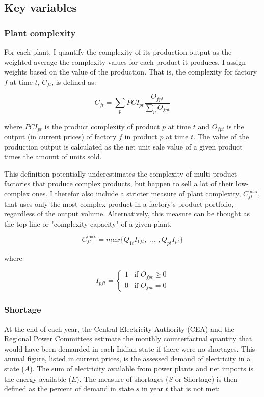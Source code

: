 \documentclass[11pt]{article}
\begin{document}
\subsection{Key variables}%
\label{sub:key_variables}

\subsubsection{Plant complexity}%
\label{sub:plant_complexity}

For each plant, I quantify the complexity of its production output as the weighted average the complexity-values for each product it produces. I assign weights based on the value of the production. That is, the complexity for factory \(f\) at time \(t\), \(C_{ft}\), is defined as:

\[
C_{ft} = \sum_p PCI_{pt} \frac{O_{fpt}}{\sum_p O_{fpt}}
\] 

where \(PCI_{pt}\) is the product complexity of product \(p\) at time \(t\) and \(O_{fpt}\) is the output (in current prices) of factory \(f\) in product \(p\) at time \(t\). The value of the production output is calculated as the net unit sale value of a given product times the amount of units sold. 

This definition potentially underestimates the complexity of multi-product factories that produce complex products, but happen to sell a lot of their low-complex ones. I therefor also include a stricter measure of plant complexity, \(C^{\text{max}}_{ft}\), that uses only the most complex product in a factory's product-portfolio, regardless of the output volume. Alternatively, this measure can be thought as the top-line or "complexity capacity" of a given plant. 

\[
C^{\text{max}}_{ft} = max \{ Q_{1t} I_{1ft}, \text{ ... }, Q_{pt} I_{pt} \}
\]

where

\[
I_{pft} = \begin{cases}
 1 & \text{if } O_{fpt} \geq 0 \\
 0 & \text{if } O_{fpt} = 0
\end{cases}
\]

\subsubsection{Shortage}%
\label{sub:shortage}

At the end of each year, the Central Electricity Authority (CEA) and the Regional Power Committees estimate the monthly counterfactual quantity that would have been demanded in each Indian state if there were no shortages. This annual figure, listed in current prices, is the assessed demand of electricity in a state (\(A\)). The sum of electricity available from power plants and net imports is the energy available ($E$). The measure of shortages (\(S\) or Shortage) is then defined as the percent of demand in state \(s\) in year \(t\) that is not met:
\end{document}
